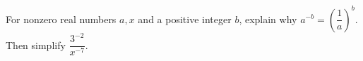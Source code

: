 For nonzero real numbers $a,x$ and a positive integer $b$, explain why $a^{-b}=\left(\dfrac{1}{a}\right)^b$. Then simplify $\dfrac{3^{-2}}{x^{-7}}$.
